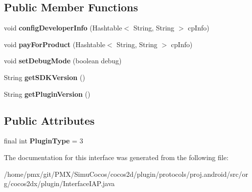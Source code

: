 \subsection*{Public Member Functions}
\begin{DoxyCompactItemize}
\item 
\mbox{\label{interfaceorg_1_1cocos2dx_1_1plugin_1_1InterfaceIAP_a497e06148de24d9df11ce381f5a25869}} 
void {\bfseries config\+Developer\+Info} (Hashtable$<$ String, String $>$ cp\+Info)
\item 
\mbox{\label{interfaceorg_1_1cocos2dx_1_1plugin_1_1InterfaceIAP_a05b4437ce160c9d8b26d31070a500671}} 
void {\bfseries pay\+For\+Product} (Hashtable$<$ String, String $>$ cp\+Info)
\item 
\mbox{\label{interfaceorg_1_1cocos2dx_1_1plugin_1_1InterfaceIAP_a492b9b104fa80aadb757b2b853ada22c}} 
void {\bfseries set\+Debug\+Mode} (boolean debug)
\item 
\mbox{\label{interfaceorg_1_1cocos2dx_1_1plugin_1_1InterfaceIAP_ab9a29fea71c25b1bc32c2798afb71be7}} 
String {\bfseries get\+S\+D\+K\+Version} ()
\item 
\mbox{\label{interfaceorg_1_1cocos2dx_1_1plugin_1_1InterfaceIAP_ac257b92326aad3aaf48affe5a088d9ca}} 
String {\bfseries get\+Plugin\+Version} ()
\end{DoxyCompactItemize}
\subsection*{Public Attributes}
\begin{DoxyCompactItemize}
\item 
\mbox{\label{interfaceorg_1_1cocos2dx_1_1plugin_1_1InterfaceIAP_a06f1dec79af6d9ab6e5f3077039b67cb}} 
final int {\bfseries Plugin\+Type} = 3
\end{DoxyCompactItemize}


The documentation for this interface was generated from the following file\+:\begin{DoxyCompactItemize}
\item 
/home/pmx/git/\+P\+M\+X/\+Simu\+Cocos/cocos2d/plugin/protocols/proj.\+android/src/org/cocos2dx/plugin/Interface\+I\+A\+P.\+java\end{DoxyCompactItemize}
